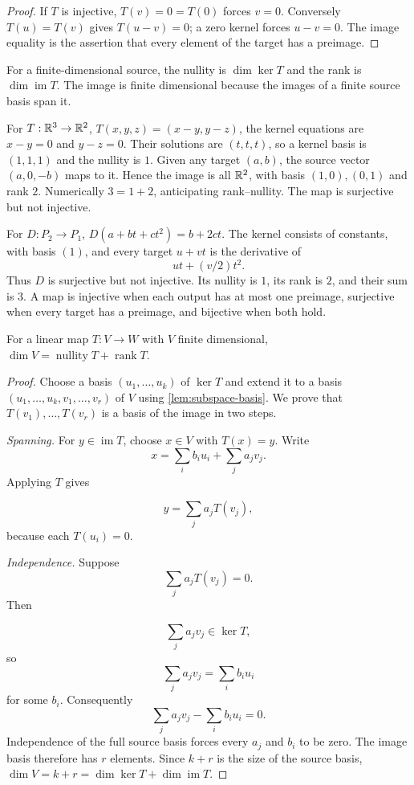 \begin{proof}
If $T$ is injective, $T(v)=0=T(0)$ forces $v=0$. Conversely $T(u)=T(v)$
gives $T(u-v)=0$; a zero kernel forces $u-v=0$. The image equality is
the assertion that every element of the target has a preimage.
\end{proof}
\begin{definition}
For a finite-dimensional source, the nullity is $\dim\ker T$ and the rank
is $\dim\operatorname{im}T$. The image is finite dimensional because the
images of a finite source basis span it.
\end{definition}
\begin{example}
For $T:\mathbb{R}^3\to\mathbb{R}^2$, $T(x,y,z)=(x-y,y-z)$, the kernel equations are
$x-y=0$ and $y-z=0$. Their solutions are $(t,t,t)$, so a kernel basis is
$(1,1,1)$ and the nullity is $1$. Given any target $(a,b)$, the source
vector $(a,0,-b)$ maps to it. Hence the image is all $\mathbb{R}^2$, with basis
$(1,0),(0,1)$ and rank $2$. Numerically $3=1+2$, anticipating rank--nullity.
The map is surjective but not injective.
\end{example}
\begin{example}
For $D:P_2\to P_1$, $D(a+bt+ct^2)=b+2ct$.
The kernel consists of constants, with basis $(1)$, and every target
$u+vt$ is the derivative of
\[
ut+(v/2)t^2.
\]
 Thus $D$ is surjective but
not injective. Its nullity is $1$, its rank is $2$, and their sum is $3$.
A map is injective when each output has at most one preimage, surjective
when every target has a preimage, and bijective when both hold.
\end{example}
\begin{theorem}
\label{thm:rank-nullity}
For a linear map $T:V\to W$ with $V$ finite dimensional,
$\dim V=\operatorname{nullity}T+\operatorname{rank}T$.
\end{theorem}
\begin{proof}
Choose a basis $(u_1,\ldots,u_k)$ of $\ker T$ and extend it to a basis
$(u_1,\ldots,u_k,v_1,\ldots,v_r)$ of $V$ using \cref{lem:subspace-basis}.
We prove that $T(v_1),\ldots,T(v_r)$ is a basis of the image in two steps.

\emph{Spanning.} For $y\in\operatorname{im}T$, choose $x\in V$ with
$T(x)=y$. Write
\[
x=\sum_i b_iu_i+\sum_j a_jv_j.
\]
 Applying $T$ gives

\[
y=\sum_j a_jT(v_j),
\]
 because each $T(u_i)=0$.

\emph{Independence.} Suppose
\[
\sum_j a_jT(v_j)=0.
\]
 Then

\[
\sum_j a_jv_j\in\ker T,
\]
 so
\[
\sum_j a_jv_j=\sum_i b_iu_i
\]
 for some $b_i$.
Consequently
\[
\sum_j a_jv_j-\sum_i b_iu_i=0.
\]
Independence of the full source basis forces every $a_j$ and $b_i$ to be zero.
The image basis therefore has $r$ elements. Since $k+r$ is the size of the
source basis, $\dim V=k+r=\dim\ker T+\dim\operatorname{im}T$.
\end{proof}
